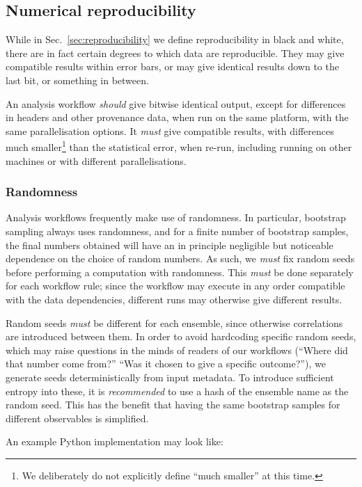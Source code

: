 \documentclass{article}
\newcommand\rfcword[1]{\emph{#1}\xspace}
\newcommand\must{\rfcword{must}}
\newcommand\should{\rfcword{should}}
\newcommand\recommended{\rfcword{recommended}}
\begin{document}
\subsection{Numerical reproducibility}

While in Sec.~\ref{sec:reproducibility} we define reproducibility in black and white,
there are in fact certain degrees to which data are reproducible.
They may give compatible results within error bars,
or may give identical results down to the last bit,
or something in between.

An analysis workflow \should give bitwise identical output,
except for differences in headers and other provenance data,
when run on the same platform,
with the same parallelisation options.
It \must give compatible results,
with differences much smaller\footnote{
  We deliberately do not explicitly define ``much smaller'' at this time.
} than the statistical error,
when re-run,
including running on other machines or with different parallelisations.

\subsubsection{Randomness}

Analysis workflows frequently make use of randomness.
In particular,
bootstrap sampling always uses randomness,
and for a finite number of bootstrap samples,
the final numbers obtained will have
an in principle negligible but noticeable dependence on the choice of random numbers.
As such,
we \must fix random seeds before performing a computation with randomness.
This \must be done separately for each workflow rule;
since the workflow may execute in any order compatible with the data dependencies,
different runs may otherwise give different results.

Random seeds \must be different for each ensemble,
since otherwise correlations are introduced between them.
In order to avoid hardcoding specific random seeds,
which may raise questions in the minds of readers of our workflows
(``Where did that number come from?''
``Was it chosen to give a specific outcome?''),
we generate seeds deterministically from input metadata.
To introduce sufficient entropy into these,
it is \recommended to use a hash of the ensemble name as the random seed.
This has the benefit that
having the same bootstrap samples for different observables is simplified.

An example Python implementation may look like:
\end{document}
